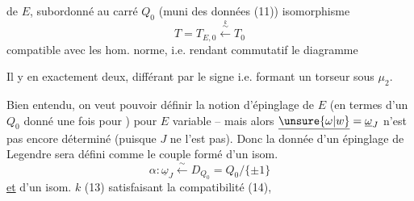   de $E$, subordonné au carré $Q_0$ (muni des données (11))   isomorphisme
\[
T=T_{E,0}\xleftarrow{\overset{k}{\sim}}T_0 \tag*{(13)}
\]
compatible avec les hom. norme, i.e. rendant commutatif le diagramme

Il y en exactement deux, différant par le signe i.e. formant un torseur sous $\mu_2$.

Bien entendu, on veut pouvoir définir la notion d'épinglage de $E$ (en termes d'un $Q_0$ donné une fois pour ) pour $E$ variable -- mais alors $\underline{\unsure{\omega|w}}=\underline\omega_J$ n'est pas encore déterminé (puisque $J$ ne l'est pas). Donc la donnée d'un épinglage de Legendre sera défini comme le couple  formé d'un isom.
\[
\alpha:\underline\omega_J\xleftarrow{\sim}D_{Q_0}=Q_0/\{\pm1\} \tag*{(15)}
\]
\uline{et} d'un isom. $k$ (13) satisfaisant la compatibilité (14),
